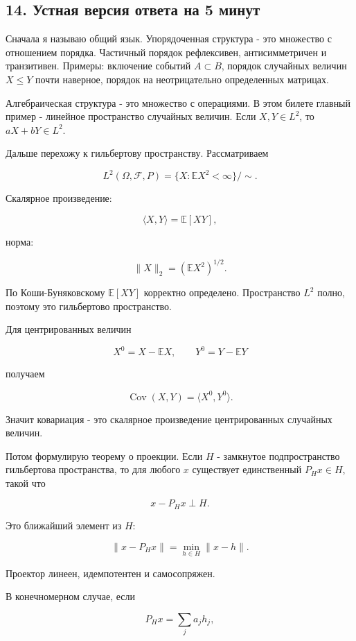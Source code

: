 \documentclass[
  11pt,
  a4paper,
]{article}
\begin{document}
\subsection{14. Устная версия ответа на 5
минут}\label{ux443ux441ux442ux43dux430ux44f-ux432ux435ux440ux441ux438ux44f-ux43eux442ux432ux435ux442ux430-ux43dux430-5-ux43cux438ux43dux443ux442}

Сначала я называю общий язык. Упорядоченная структура - это множество с
отношением порядка. Частичный порядок рефлексивен, антисимметричен и
транзитивен. Примеры: включение событий \(A\subset B\), порядок
случайных величин \(X\le Y\) почти наверное, порядок на неотрицательно
определенных матрицах.

Алгебраическая структура - это множество с операциями. В этом билете
главный пример - линейное пространство случайных величин. Если
\(X,Y\in L^2\), то \(aX+bY\in L^2\).

Дальше перехожу к гильбертову пространству. Рассматриваем

\[
L^2(\Omega,\mathcal F,P)=\{X:\mathbb EX^2<\infty\}/\sim.
\]

Скалярное произведение:

\[
\langle X,Y\rangle=\mathbb E[XY],
\]

норма:

\[
\|X\|_2=(\mathbb EX^2)^{1/2}.
\]

По Коши-Буняковскому \(\mathbb E[XY]\) корректно определено.
Пространство \(L^2\) полно, поэтому это гильбертово пространство.

Для центрированных величин

\[
X^0=X-\mathbb EX,\qquad Y^0=Y-\mathbb EY
\]

получаем

\[
\operatorname{Cov}(X,Y)=\langle X^0,Y^0\rangle.
\]

Значит ковариация - это скалярное произведение центрированных случайных
величин.

Потом формулирую теорему о проекции. Если \(H\) - замкнутое
подпространство гильбертова пространства, то для любого \(x\) существует
единственный \(P_Hx\in H\), такой что

\[
x-P_Hx\perp H.
\]

Это ближайший элемент из \(H\):

\[
\|x-P_Hx\|=\min_{h\in H}\|x-h\|.
\]

Проектор линеен, идемпотентен и самосопряжен.

В конечномерном случае, если

\[
P_Hx=\sum_j a_jh_j,
\]
\end{document}
